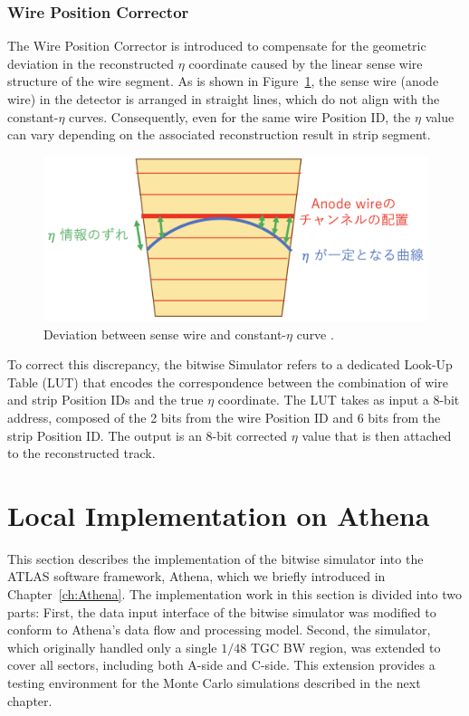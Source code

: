 \subsubsection{Wire Position Corrector}

The Wire Position Corrector is introduced to compensate for the geometric deviation in the reconstructed \(\eta\) coordinate caused by the linear sense wire structure of the wire segment. As is shown in Figure~\ref{fig:wire_corr}, the sense wire (anode wire) in the detector is arranged in straight lines, which do not align with the constant-\(\eta\) curves. Consequently, even for the same wire Position ID, the \(\eta\) value can vary depending on the associated reconstruction result in strip segment.

\begin{figure}[htbp]
  \centering
  \includegraphics[width=1.0\textwidth]{figs/chapter5/wire_corr.png}
  \caption{Deviation between sense wire and constant-\(\eta\) curve \cite{yamashita}.}
  \label{fig:wire_corr}
\end{figure}

To correct this discrepancy, the bitwise Simulator refers to a dedicated Look-Up Table (LUT) that encodes the correspondence between the combination of wire and strip Position IDs and the true \(\eta\) coordinate. The LUT takes as input a 8-bit address, composed of the 2 bits from the wire Position ID and 6 bits from the strip Position ID. The output is an 8-bit corrected \(\eta\) value that is then attached to the reconstructed track.

\section{Local Implementation on Athena} \label{sec:LocalImplementationOnAthena}
This section describes the implementation of the bitwise simulator into the ATLAS software framework, Athena, which we briefly introduced in Chapter~\ref{ch:Athena}. The implementation work in this section is divided into two parts: 
First, the data input interface of the bitwise simulator was modified to conform to Athena's data flow and processing model. Second, the simulator, which originally handled only a single \(1/48\) TGC BW region, was extended to cover all sectors, including both A-side and C-side. This extension provides a testing environment for the Monte Carlo simulations described in the next chapter.
